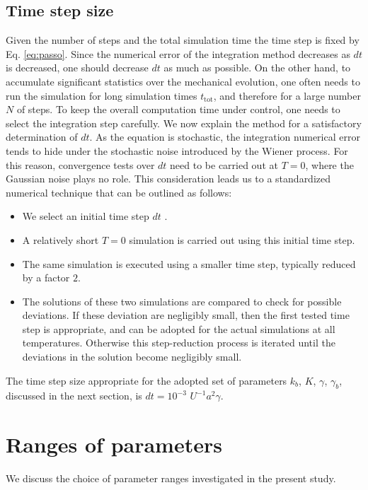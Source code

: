 \subsection{Time step size}
Given the number of steps and the total simulation time the time step is fixed by Eq. \eqref{eq:passo}. Since the numerical error of the integration method decreases as $dt$ is decreased, one should decrease $dt$ as much as possible. On the other hand, to accumulate significant statistics over the mechanical evolution, one often needs to run the simulation for long simulation times $t_\text{tot}$, and therefore for a large number $N$ of steps. To keep the overall computation time under control, one needs to select the integration step carefully. We now explain the method for a satisfactory determination of $dt$. As the equation is stochastic, the integration numerical error tends to hide under the stochastic noise introduced by the Wiener process. For this reason, convergence tests over $dt$ need to be carried out at $T=0$, where the Gaussian noise plays no role. This consideration leads us to a standardized numerical technique that can be outlined as follows: 
\begin{itemize}[label={\scalebox{0.4}{$\blacksquare$}}]
    \item We select an initial time step $dt$ .
    \item A relatively short $T=0$ simulation is carried out using this initial time step.
    \item The same simulation is executed using a smaller time step, typically reduced by a factor $2$.
    \item The solutions of these two simulations are compared to check for possible deviations. If these deviation are negligibly small, then the first tested time step is appropriate, and can be adopted for the actual simulations at all temperatures. Otherwise this step-reduction process is iterated until the deviations in the solution become negligibly small.
\end{itemize}
 The time step size appropriate for the adopted set of parameters $k_b$, $K$, $\gamma$, $\gamma_b$, discussed in the next section, is $dt=10^{-3}$ $U^{-1}a^2 \gamma$.
\newpage
\section{Ranges of parameters}
We discuss the choice of parameter ranges investigated in the present study.
